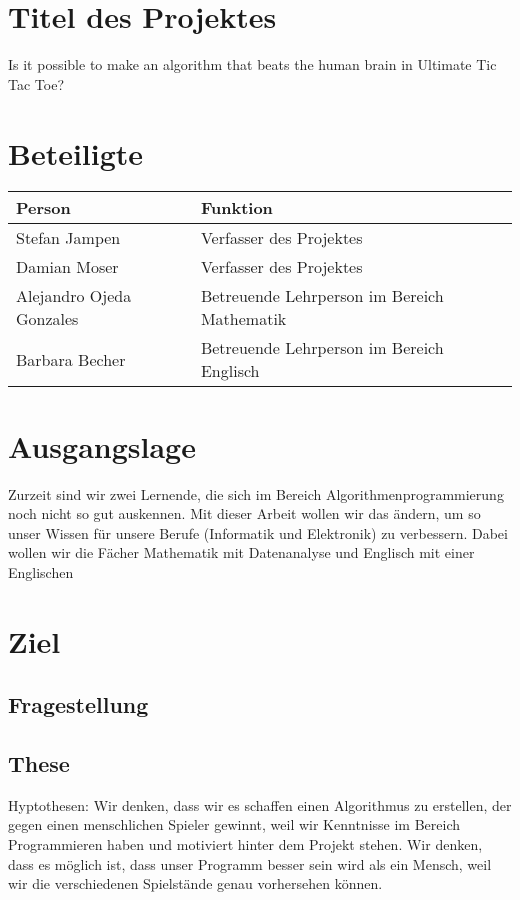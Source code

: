 \section{Titel des Projektes}
Is it possible to make an algorithm that beats the human brain in Ultimate Tic Tac Toe?

\section{Beteiligte}
\begin{tabularx}{\textwidth}{l|X}
\textbf{Person} & \textbf{Funktion} \\\hline
Stefan Jampen & Verfasser des Projektes \\
Damian Moser & Verfasser des Projektes \\
Alejandro Ojeda Gonzales & Betreuende Lehrperson im Bereich Mathematik \\
Barbara Becher & Betreuende Lehrperson im Bereich Englisch \\
\end{tabularx}

\section{Ausgangslage}
Zurzeit sind wir zwei Lernende, die sich im Bereich Algorithmenprogrammierung noch nicht so gut auskennen. Mit dieser Arbeit wollen wir das ändern, um so unser Wissen für unsere Berufe (Informatik und Elektronik) zu verbessern. Dabei wollen wir die Fächer Mathematik mit Datenanalyse und Englisch mit einer Englischen

\section{Ziel}

\subsection{Fragestellung}

\subsection{These}
Hyptothesen:
Wir denken, dass wir es schaffen einen Algorithmus zu erstellen, der gegen einen menschlichen Spieler gewinnt, weil wir Kenntnisse im Bereich Programmieren haben und motiviert hinter dem Projekt stehen.
Wir denken, dass es möglich ist, dass unser Programm besser sein wird als ein Mensch, weil wir die verschiedenen Spielstände genau vorhersehen können.

